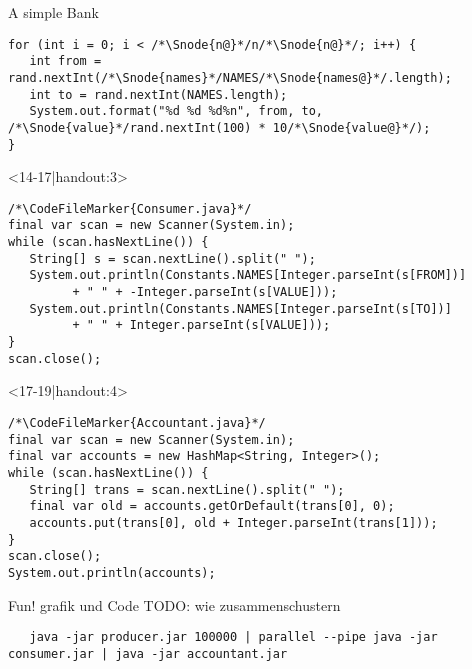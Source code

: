 \begin{frame}[fragile]{A simple Bank}
\begin{onlyenv}
\begin{layout-imageonly}
\begin{onlyenv}
\begin{verbatim}
for (int i = 0; i < /*\Snode{n@}*/n/*\Snode{n@}*/; i++) {
   int from = rand.nextInt(/*\Snode{names}*/NAMES/*\Snode{names@}*/.length);
   int to = rand.nextInt(NAMES.length);
   System.out.format("%d %d %d%n", from, to, /*\Snode{value}*/rand.nextInt(100) * 10/*\Snode{value@}*/);
}
\end{verbatim}
\end{onlyenv}
\begin{onlyenv}<14-17|handout:3>
\begin{verbatim}
/*\CodeFileMarker{Consumer.java}*/
final var scan = new Scanner(System.in);
while (scan.hasNextLine()) {
   String[] s = scan.nextLine().split(" ");
   System.out.println(Constants.NAMES[Integer.parseInt(s[FROM])]
         + " " + -Integer.parseInt(s[VALUE]));
   System.out.println(Constants.NAMES[Integer.parseInt(s[TO])]
         + " " + Integer.parseInt(s[VALUE]));
}
scan.close();
\end{verbatim}
\end{onlyenv}
\begin{onlyenv}<17-19|handout:4>
\begin{verbatim}
/*\CodeFileMarker{Accountant.java}*/
final var scan = new Scanner(System.in);
final var accounts = new HashMap<String, Integer>();
while (scan.hasNextLine()) {
   String[] trans = scan.nextLine().split(" ");
   final var old = accounts.getOrDefault(trans[0], 0);
   accounts.put(trans[0], old + Integer.parseInt(trans[1]));
}
scan.close();
System.out.println(accounts);
\end{verbatim}
\end{onlyenv}
\end{layout-imageonly}
\end{onlyenv}
\end{frame}

\begin{frame}[fragile]{Fun!}
   grafik und Code
TODO: wie zusammenschustern
\begin{verbatim}
   java -jar producer.jar 100000 | parallel --pipe java -jar consumer.jar | java -jar accountant.jar
\end{verbatim}
\end{frame}

